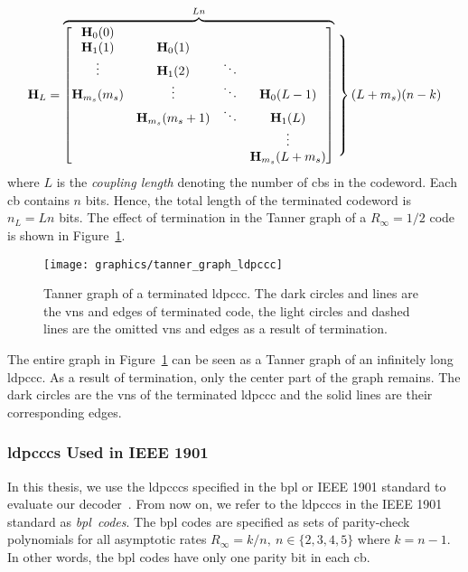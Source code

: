 \begin{align}
\mathbf{H}_L = 
\overbrace{\begin{bmatrix}
  \mathbf{H}_{0}(0)\\
  \mathbf{H}_1(1) &\mathbf{H}_0(1)\\
  \vdots &\mathbf{H}_1(2) &\ddots\\
  \mathbf{H}_{m_s}(m_s) &\vdots &\ddots &\mathbf{H}_0(L-1)\\
  &\mathbf{H}_{m_s}(m_s+1) &\ddots &\mathbf{H}_{1}(L)\\
  & & &\vdots\\
  & & &\mathbf{H}_{m_s}(L+m_s)
\end{bmatrix}}^{Ln}
\left.\begin{matrix}
\\
\\
\\
\\
\\
\\
\\
\\
\end{matrix}\right\}(L+m_s)(n-k)
\end{align}
where $L$ is the \emph{coupling length} denoting the number of \acp{cb} in the codeword. Each \ac{cb} contains $n$ bits. Hence, the total length of the terminated codeword is $n_L=Ln$ bits. The effect of termination in the Tanner graph of a $R_\infty=1/2$ code is shown in Figure~\ref{fig:tannGraphLdpccc}.
\begin{figure}[htbp]
  \centering
  \texttt{[image: graphics/tanner\_graph\_ldpccc]}
  \caption{Tanner graph of a terminated \ac{ldpccc}. The dark circles and lines are the \acp{vn} and edges of terminated code, the light circles and dashed lines are the omitted \acp{vn} and edges as a result of termination.}
  \label{fig:tannGraphLdpccc}
\end{figure}
The entire graph in Figure~\ref{fig:tannGraphLdpccc} can be seen as a Tanner graph of an infinitely long \ac{ldpccc}. As a result of termination, only the center part of the graph remains. The dark circles are the \acp{vn} of the terminated \ac{ldpccc} and the solid lines are their corresponding edges.

\subsubsection{\aclp{ldpccc} Used in IEEE 1901}
In this thesis, we use the \acp{ldpccc} specified in the \ac{bpl} or IEEE 1901 standard to evaluate our decoder~\cite{Bpl}. From now on, we refer to the \acp{ldpccc} in the IEEE 1901 standard as \emph{\ac{bpl}~codes}. The \ac{bpl} codes are specified as sets of parity-check polynomials for all asymptotic rates $R_\infty=k/n,\ n\in\{2,3,4,5\}$ where $k=n-1$. In other words, the \ac{bpl} codes have only one parity bit in each \ac{cb}. 

